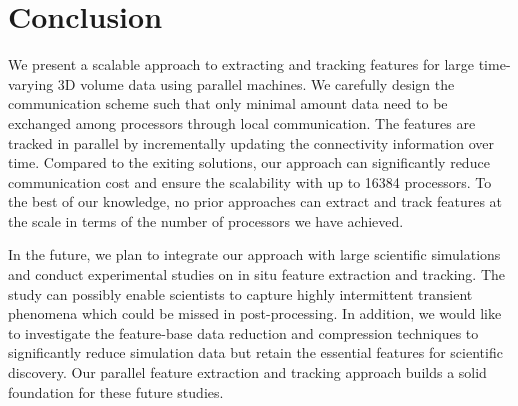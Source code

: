 \section{Conclusion}

We present a scalable approach to extracting and tracking features for large time-varying 3D volume data using parallel machines. We carefully design the communication scheme such that only minimal amount data need to be exchanged among processors through local communication. The features are tracked in parallel by incrementally updating the connectivity information over time. Compared to the exiting solutions, our approach can significantly reduce  communication cost and ensure the scalability with up to 16384 processors. To the best of our knowledge, no prior approaches can extract and track features at the scale in terms of the number of processors we have achieved. 

In the future, we plan to integrate our approach with large scientific simulations and conduct experimental studies on in situ feature extraction and tracking. %
The study can possibly enable scientists to capture highly intermittent transient phenomena which could be missed in post-processing. In addition, we would like to investigate the feature-base data reduction and compression techniques to significantly reduce simulation data but retain the essential features for scientific discovery. Our parallel feature extraction and tracking approach builds a solid foundation for these future studies.   

